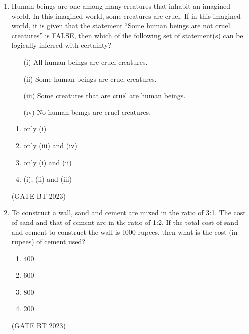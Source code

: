 \documentclass[journal,12pt,onecolumn]{IEEEtran}
\begin{document}
\begin{enumerate}
    \item Human beings are one among many creatures that inhabit an imagined world. In this imagined world, some creatures are cruel. If in this imagined world, it is given that the statement “Some human beings are not cruel creatures” is FALSE, then which of the following set of statement(s) can be logically inferred with certainty?
    \begin{enumerate}
        \item[(i)] All human beings are cruel creatures.
        \item[(ii)] Some human beings are cruel creatures.
        \item[(iii)] Some creatures that are cruel are human beings.
        \item[(iv)] No human beings are cruel creatures.
    \end{enumerate}
    \begin{enumerate}
        \item only (i)
        \item only (iii) and (iv)
        \item only (i) and (ii)
        \item (i), (ii) and (iii)
    \end{enumerate}
    \hfill(GATE BT 2023)

    \item To construct a wall, sand and cement are mixed in the ratio of 3:1. The cost of sand and that of cement are in the ratio of 1:2. If the total cost of sand and cement to construct the wall is 1000 rupees, then what is the cost (in rupees) of cement used?
    \begin{enumerate}
        \item 400
        \item 600
        \item 800
        \item 200
    \end{enumerate}
    \hfill(GATE BT 2023)


\end{enumerate}
\end{document}
